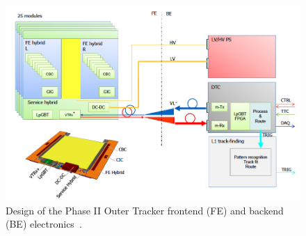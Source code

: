 \begin{figure}[hbtp]
\centering
\includegraphics[width=.65\linewidth]{tex/Part2/fig/OT/OT-DAQoverview.png}
\caption{
  Design of the Phase II Outer Tracker frontend (FE) and backend (BE) electronics~\cite{CERN-LHCC-2017-009}.  
}   
\label{fig:OT_DAQ}
\end{figure}







